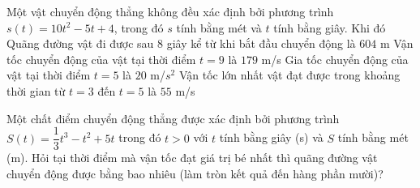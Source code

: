 \begin{ex}%
	Một vật chuyển động thẳng không đều xác định bởi phương trình $s(t)=10 t^{2} - 5 t + 4$, trong đó ${s}$ tính bằng mét và ${t}$ tính bằng giây. Khi đó
	\choiceTF
	{ \True Quãng đường vật đi được sau ${8}$ giây kể từ khi bắt đầu chuyển động là ${604}$ m}
	{ Vận tốc chuyển động của vật tại thời điểm $t=9$ là ${179}$ m/s}
	{ \True Gia tốc chuyển động của vật tại thời điểm $t=5$ là ${20}$ m/$s^2$}
	{ Vận tốc lớn nhất vật đạt được trong khoảng thời gian từ $t=3$ đến $t=5$ là $55$ m/s}
	\end{ex}

\begin{ex}%
	Một chất điểm chuyển động thẳng được xác định bởi phương trình $S\left(t\right)=\dfrac{1}{3} t^3-t^2+5t$ trong đó $t>0$ với $t$ tính bằng giây (s) và $S$ tính bằng mét (m). Hỏi tại thời điểm mà vận tốc đạt giá trị bé nhất thì quãng đường vật chuyển động được bằng bao nhiêu (làm tròn kết quả đến hàng phần mười)?
\end{ex}

